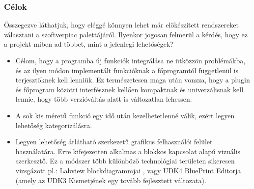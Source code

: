 \documentclass[a4paper,12pt,oneside]{report}
\begin{document}
\subsubsection{Célok}
Összegezve láthatjuk, hogy eléggé könnyen lehet már előkészített rendszereket választani a szoftverpiac palettájáról. Ilyenkor jogosan felmerül a kérdés, hogy ez a projekt miben ad többet, mint a jelenlegi lehetőségek? 
\begin{itemize}

\item Célom, hogy a programba új funkciók integrálása ne ütközzön problémákba, és az ilyen módon implementált funkcióknak a főprogramtól függetlenül is terjesztőknek kell lenniük. Ez természetesen maga után vonzza, hogy a plugin és főprogram közötti interfésznek kellően kompaktnak és univerzálisnak kell lennie, hogy több verzióváltás alatt is változatlan lehessen.

\item A sok kis méretű funkció egy idő után kezelhetetlenné válik, ezért legyen lehetőség kategorizálásra.

\item Legyen lehetőség átlátható szerkezetű grafikus felhasználói felület használatára. Erre kifejezetten alkalmas a blokkos kapcsolat alapú vizuális szerkesztő. Ez a módszer több különböző technológiai területen sikeresen vizsgázott pl.: Labview blockdiagrammjai \cite{website:ni_blocks}, vagy UDK4 BluePrint Editorja\cite{website:udk_blueprint} (amely az UDK3 Kismetjének egy tovább fejlesztett változata).
\end{itemize}
\end{document}
